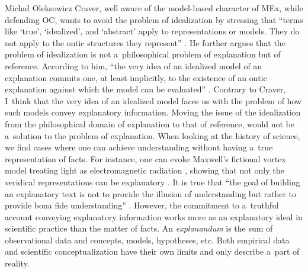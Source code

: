 \begin{artengenv}{Michał Oleksowicz}
Craver, well aware of the model-based character of MEx, while defending OC, wants to avoid the problem of idealization by stressing that ``terms like ‘true', ‘idealized', and ‘abstract' apply to representations or models. They do not apply to the ontic structures they represent''
\parencite[][p.50]{kaiser_ontic_2014}. %
 He further argues that the problem of idealization is not a~philosophical problem of explanation but of reference. According to him, ``the very idea of an idealized model of an explanation commits one, at least implicitly, to the existence of an ontic explanation against which the model can be evaluated'' 
\parencite[][p.50]{kaiser_ontic_2014}. %
 Contrary to Craver, I~think that the very idea of an idealized model faces us with the problem of how such models convey explanatory information. Moving the issue of the idealization from the philosophical domain of explanation to that of reference, would not be a~solution to the problem of explanation. When looking at the history of science, we find cases where one can achieve understanding without having a~true representation of facts. For instance, one can evoke Maxwell's fictional vortex model treating light as electromagnetic radiation 
\parencite[][]{de_regt_scientific_2015}, %
 showing that not only the veridical representations can be explanatory 
\parencite[][]{bokulich_fiction_2016}. %
 It is true that ``the goal of building an explanatory text is not to provide the illusion of understanding but rather to provide bona fide understanding'' 
\parencite[][p.49]{kaiser_ontic_2014}. %
 However, the commitment to a~truthful account conveying explanatory information works more as an explanatory ideal in scientific practice than the matter of facts. An \textit{explanandum} is the sum of observational data and concepts, models, hypotheses, etc. Both empirical data and scientific conceptualization have their own limits and only describe a~part of reality.


\end{artengenv}
